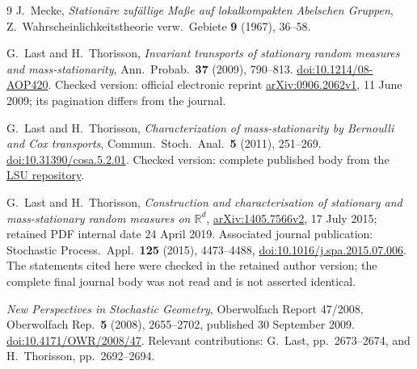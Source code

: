 \documentclass[11pt]{article}
\begin{document}
\begin{thebibliography}{9}
J.~Mecke, \emph{Station\"are zuf\"allige Ma\ss e auf lokalkompakten Abelschen Gruppen},
Z.\ Wahrscheinlichkeitstheorie verw.\ Gebiete \textbf{9} (1967), 36--58.

G.~Last and H.~Thorisson, \emph{Invariant transports of stationary random measures and mass-stationarity},
Ann.\ Probab.\ \textbf{37} (2009), 790--813.
\href{https://doi.org/10.1214/08-AOP420}{doi:10.1214/08-AOP420}.
Checked version: official electronic reprint
\href{https://arxiv.org/abs/0906.2062v1}{arXiv:0906.2062v1}, 11 June 2009;
its pagination differs from the journal.

G.~Last and H.~Thorisson, \emph{Characterization of mass-stationarity by Bernoulli and Cox transports},
Commun.\ Stoch.\ Anal.\ \textbf{5} (2011), 251--269.
\href{https://doi.org/10.31390/cosa.5.2.01}{doi:10.31390/cosa.5.2.01}.
Checked version: complete published body from the
\href{https://repository.lsu.edu/cosa/vol5/iss2/1/}{LSU repository}.

G.~Last and H.~Thorisson, \emph{Construction and characterisation of stationary and mass-stationary random measures on $\mathbb R^d$},
\href{https://arxiv.org/abs/1405.7566v2}{arXiv:1405.7566v2}, 17 July 2015;
retained PDF internal date 24 April 2019.
Associated journal publication: Stochastic Process.\ Appl.\ \textbf{125} (2015), 4473--4488,
\href{https://doi.org/10.1016/j.spa.2015.07.006}{doi:10.1016/j.spa.2015.07.006}.
The statements cited here were checked in the retained author version;
the complete final journal body was not read and is not asserted identical.

\emph{New Perspectives in Stochastic Geometry}, Oberwolfach Report 47/2008,
Oberwolfach Rep.\ \textbf{5} (2008), 2655--2702, published 30 September 2009.
\href{https://doi.org/10.4171/OWR/2008/47}{doi:10.4171/OWR/2008/47}.
Relevant contributions: G.~Last, pp.\ 2673--2674, and H.~Thorisson, pp.\ 2692--2694.
\end{thebibliography}
\end{document}
